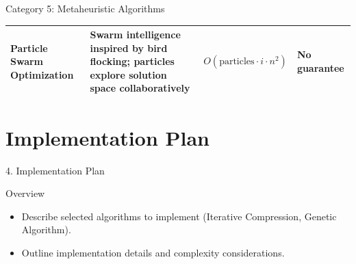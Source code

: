 \documentclass[aspectratio=169]{beamer}
\begin{document}
\begin{frame}{Category 5: Metaheuristic Algorithms}
\begin{table}
\begin{tabular}{@{}p{3cm}p{5.5cm}p{2.5cm}p{2cm}@{}}
			\textbf{Particle Swarm Optimization}                                                                      &
			Swarm intelligence inspired by bird flocking; particles explore solution space collaboratively            &
			$O(\text{particles} \cdot i \cdot n^2)$                                                                   &
			No guarantee                                                                                                                                                                       \\

			\bottomrule
		\end{tabular}
	\end{table}

\end{frame}


\section{Implementation Plan}

\begin{frame}{4. Implementation Plan}
	\begin{block}{Overview}
		\begin{itemize}
			\item Describe selected algorithms to implement (Iterative Compression, Genetic Algorithm).
			\item Outline implementation details and complexity considerations.
		\end{itemize}
	\end{block}
\end{frame}

\end{document}
